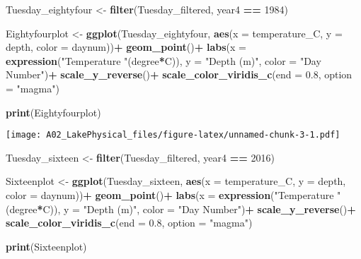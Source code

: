 \documentclass[]{article}
\newenvironment{Shaded}{\begin{snugshade}}{\end{snugshade}}
\newcommand{\DataTypeTok}[1]{\textcolor[rgb]{0.13,0.29,0.53}{#1}}
\newcommand{\DecValTok}[1]{\textcolor[rgb]{0.00,0.00,0.81}{#1}}
\newcommand{\FloatTok}[1]{\textcolor[rgb]{0.00,0.00,0.81}{#1}}
\newcommand{\KeywordTok}[1]{\textcolor[rgb]{0.13,0.29,0.53}{\textbf{#1}}}
\newcommand{\NormalTok}[1]{#1}
\newcommand{\OperatorTok}[1]{\textcolor[rgb]{0.81,0.36,0.00}{\textbf{#1}}}
\newcommand{\StringTok}[1]{\textcolor[rgb]{0.31,0.60,0.02}{#1}}
\begin{document}
\begin{Shaded}
\begin{Highlighting}[]
\NormalTok{Tuesday_eightyfour <-}\StringTok{ }\KeywordTok{filter}\NormalTok{(Tuesday_filtered, year4 }\OperatorTok{==}\StringTok{ }\DecValTok{1984}\NormalTok{)}

\NormalTok{Eightyfourplot <-}\StringTok{ }\KeywordTok{ggplot}\NormalTok{(Tuesday_eightyfour, }\KeywordTok{aes}\NormalTok{(}\DataTypeTok{x =}\NormalTok{ temperature_C, }\DataTypeTok{y =}\NormalTok{ depth, }\DataTypeTok{color =}\NormalTok{ daynum))}\OperatorTok{+}
\StringTok{  }\KeywordTok{geom_point}\NormalTok{()}\OperatorTok{+}
\StringTok{  }\KeywordTok{labs}\NormalTok{(}\DataTypeTok{x =} \KeywordTok{expression}\NormalTok{(}\StringTok{"Temperature "}\NormalTok{(degree}\OperatorTok{*}\NormalTok{C)), }\DataTypeTok{y =} \StringTok{"Depth (m)"}\NormalTok{, }\DataTypeTok{color =} \StringTok{"Day Number"}\NormalTok{)}\OperatorTok{+}
\StringTok{  }\KeywordTok{scale_y_reverse}\NormalTok{()}\OperatorTok{+}
\StringTok{  }\KeywordTok{scale_color_viridis_c}\NormalTok{(}\DataTypeTok{end =} \FloatTok{0.8}\NormalTok{, }\DataTypeTok{option =} \StringTok{"magma"}\NormalTok{)}

\KeywordTok{print}\NormalTok{(Eightyfourplot)}
\end{Highlighting}
\end{Shaded}

\texttt{[image: A02\_LakePhysical\_files/figure-latex/unnamed-chunk-3-1.pdf]}

\begin{Shaded}
\begin{Highlighting}[]
\NormalTok{Tuesday_sixteen <-}\StringTok{ }\KeywordTok{filter}\NormalTok{(Tuesday_filtered, year4 }\OperatorTok{==}\StringTok{ }\DecValTok{2016}\NormalTok{)}

\NormalTok{Sixteenplot <-}\StringTok{ }\KeywordTok{ggplot}\NormalTok{(Tuesday_sixteen, }\KeywordTok{aes}\NormalTok{(}\DataTypeTok{x =}\NormalTok{ temperature_C, }\DataTypeTok{y =}\NormalTok{ depth, }\DataTypeTok{color =}\NormalTok{ daynum))}\OperatorTok{+}
\StringTok{  }\KeywordTok{geom_point}\NormalTok{()}\OperatorTok{+}
\StringTok{  }\KeywordTok{labs}\NormalTok{(}\DataTypeTok{x =} \KeywordTok{expression}\NormalTok{(}\StringTok{"Temperature "}\NormalTok{(degree}\OperatorTok{*}\NormalTok{C)), }\DataTypeTok{y =} \StringTok{"Depth (m)"}\NormalTok{, }\DataTypeTok{color =} \StringTok{"Day Number"}\NormalTok{)}\OperatorTok{+}
\StringTok{  }\KeywordTok{scale_y_reverse}\NormalTok{()}\OperatorTok{+}
\StringTok{  }\KeywordTok{scale_color_viridis_c}\NormalTok{(}\DataTypeTok{end =} \FloatTok{0.8}\NormalTok{, }\DataTypeTok{option =} \StringTok{"magma"}\NormalTok{)}

\KeywordTok{print}\NormalTok{(Sixteenplot)}
\end{Highlighting}
\end{Shaded}
\end{document}
